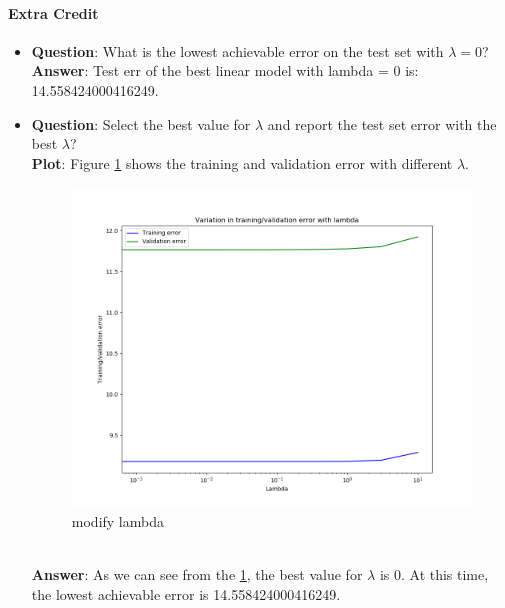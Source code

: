 \documentclass[paper=a4, fontsize=11pt]{scrartcl} %
\numberwithin{equation}{section} %
\numberwithin{figure}{section} %
\numberwithin{table}{section} %
\begin{document}
\paragraph{\textbf{Extra Credit}}
\begin{itemize}
	\item
        \textbf{Question}: What is the lowest achievable error on the test set with $\lambda=0$?
     \\ \textbf{Answer}: Test err of the best linear model with lambda = 0 is: 14.558424000416249.

     \item
        \textbf{Question}:  Select the best value for $\lambda$ and report the test set error with the best $\lambda$?
    \\ \textbf{Plot}:
        Figure \ref{fig:extraCredit1} shows the training and validation error with different $\lambda$.
        \begin{figure}
     		\centering
     		\includegraphics[scale=0.3]{liner.png}
     		\caption{modify lambda}
     		\label{fig:extraCredit1}
     	\end{figure}
     \\ \textbf{Answer}: As we can see from the \ref{fig:extraCredit1}, the best value for $\lambda$ is 0. At this time, the lowest achievable error is 14.558424000416249.


\end{itemize}
\end{document}
